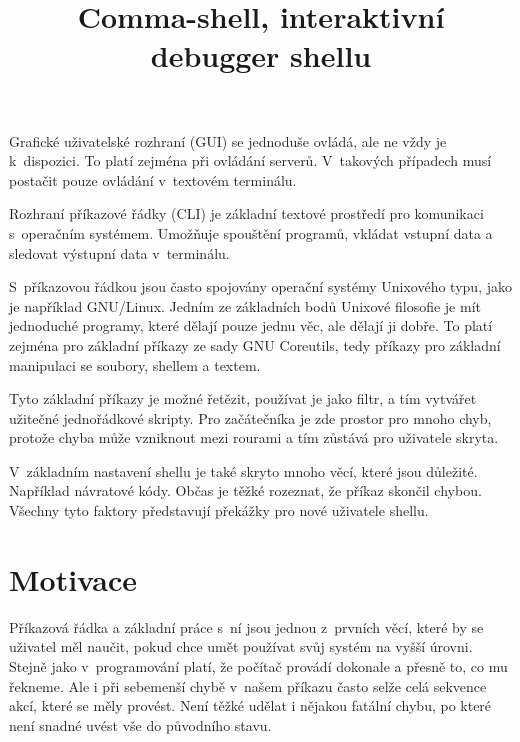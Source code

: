 \documentclass[thesis=M,czech]{FITthesis}[2012/06/26]
\title{Comma-shell, interaktivní debugger shellu}
\begin{document}
\lstset{basicstyle=\footnotesize\ttfamily,breaklines=true,showstringspaces=false,captionpos=b}
\renewcommand{\lstlistingname}{Ukázka}




\begin{introduction}


Grafické uživatelské rozhraní (GUI) se jednoduše ovládá, ale ne vždy je k~dispozici. To platí zejména při ovládání serverů. V~takových případech musí postačit pouze ovládání v~textovém terminálu.

Rozhraní příkazové řádky (CLI) je základní textové prostředí pro komunikaci s~operačním systémem. Umožňuje spouštění programů, vkládat vstupní data a sledovat výstupní data v~terminálu.

S~příkazovou řádkou jsou často spojovány operační systémy Unixového typu, jako je například GNU/Linux. Jedním ze základních bodů Unixové filosofie je mít jednoduché programy, které dělají pouze jednu věc, ale dělají ji dobře. To platí zejména pro základní příkazy ze sady GNU Coreutils, tedy příkazy pro základní manipulaci se soubory, shellem a textem.

Tyto základní příkazy je možné řetězit, používat je jako filtr, a tím vytvářet užitečné jednořádkové skripty. Pro začátečníka je zde prostor pro mnoho chyb, protože chyba může vzniknout mezi rourami a tím zůstává pro uživatele skryta.

V~základním nastavení shellu je také skryto mnoho věcí, které jsou důležité. Například návratové kódy. Občas je těžké rozeznat, že příkaz skončil chybou. Všechny tyto faktory představují překážky pro nové uživatele shellu.


\section{Motivace}

Příkazová řádka a základní práce s~ní jsou jednou z~prvních věcí, které by se uživatel měl naučit, pokud chce umět používat svůj systém na vyšší úrovni. Stejně jako v~programování platí, že počítač provádí dokonale a přesně to, co mu řekneme. Ale i při sebemenší chybě v~našem příkazu často selže celá sekvence akcí, které se měly provést. Není těžké udělat i nějakou fatální chybu, po které není snadné uvést vše do původního stavu.


\end{introduction}
\end{document}
